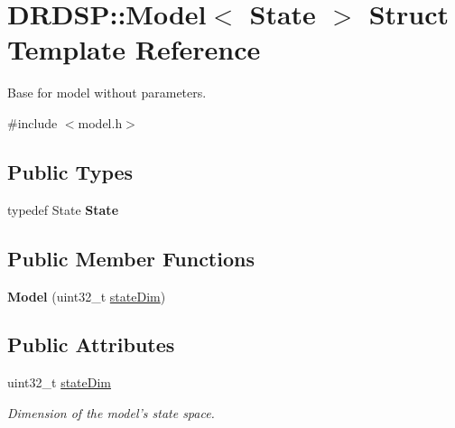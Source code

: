 \hypertarget{struct_d_r_d_s_p_1_1_model}{\section{D\-R\-D\-S\-P\-:\-:Model$<$ State $>$ Struct Template Reference}
\label{struct_d_r_d_s_p_1_1_model}
}


Base for model without parameters.  




{\ttfamily \#include $<$model.\-h$>$}

\subsection*{Public Types}
\begin{DoxyCompactItemize}
\item 
\hypertarget{struct_d_r_d_s_p_1_1_model_a30ca6d1a4dbcb6801ccb5a2421cbc434}{typedef State {\bfseries State}}\label{struct_d_r_d_s_p_1_1_model_a30ca6d1a4dbcb6801ccb5a2421cbc434}

\end{DoxyCompactItemize}
\subsection*{Public Member Functions}
\begin{DoxyCompactItemize}
\item 
\hypertarget{struct_d_r_d_s_p_1_1_model_aa14d5a47ab0d94ab7c17ffe9c50125a4}{{\bfseries Model} (uint32\-\_\-t \hyperlink{struct_d_r_d_s_p_1_1_model_a5689ac0bda80d0ae6db69443439ce1b5}{state\-Dim})}\label{struct_d_r_d_s_p_1_1_model_aa14d5a47ab0d94ab7c17ffe9c50125a4}

\end{DoxyCompactItemize}
\subsection*{Public Attributes}
\begin{DoxyCompactItemize}
\item 
\hypertarget{struct_d_r_d_s_p_1_1_model_a5689ac0bda80d0ae6db69443439ce1b5}{uint32\-\_\-t \hyperlink{struct_d_r_d_s_p_1_1_model_a5689ac0bda80d0ae6db69443439ce1b5}{state\-Dim}}\label{struct_d_r_d_s_p_1_1_model_a5689ac0bda80d0ae6db69443439ce1b5}

\begin{DoxyCompactList}\small\item\em Dimension of the model's state space. \end{DoxyCompactList}\end{DoxyCompactItemize}


